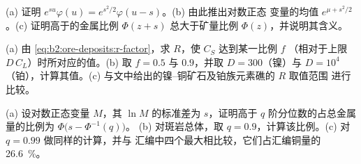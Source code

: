 \begin{exercise}[$\star\star\star$]\label{exo:b2:ore-deposits:10}
(a) 证明 $e^{su}\varphi(u) = e^{s^2/2}\varphi(u - s)$。(b) 由此推出对数正态
变量的均值 $e^{\mu + s^2/2}$。(c) 证明高于的金属比例
$\Phi(z + s)$ 总大于矿量比例 $\Phi(z)$，并说明其含义。
\end{exercise}

\begin{exercise}[$\star\star\star$]\label{exo:b2:ore-deposits:11}
(a) 由 \eqref{eq:b2:ore-deposits:r-factor}，求 $R$，使 $C_S$ 达到某一比例 $f$
（相对于上限 $D\,C_L$）时所对应的值。(b) 取 $f = 0.5$ 与 $0.9$，并取 $D = 300$（镍）与 $D =
10^4$（铂），计算其值。(c) 与文中给出的镍–铜矿石及铂族元素礁的 $R$ 取值范围
进行比较。
\end{exercise}

\begin{exercise}[$\star\star\star$]\label{exo:b2:ore-deposits:12}
(a) 设对数正态变量 $M$，其 $\ln M$ 的标准差为 $s$，证明高于
$q$ 阶分位数的占总金属量的比例为 $\Phi\bigl(s - \Phi^{-1}(q)\bigr)$。
(b) 对斑岩总体，取 $q = 0.9$，计算该比例。(c) 对 $q = 0.99$ 做同样的计算，并与
汇编中四个最大相比较，它们占汇编铜量的 \qty{26.6}{\percent}。
\end{exercise}

